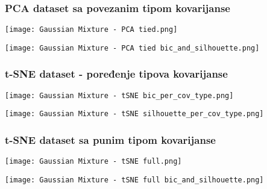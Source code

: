 \documentclass[a4paper]{article}
\begin{document}
        \newpage
        \subsubsection{PCA dataset sa povezanim tipom kovarijanse}
        \begin{center}
            \label{im:Gaussian Mixture - tied}
            \texttt{[image: Gaussian Mixture - PCA tied.png]}
        \end{center}
        \begin{center}
            \label{im:Gaussian Mixture - tied}
            \texttt{[image: Gaussian Mixture - PCA tied bic\_and\_silhouette.png]}
        \end{center}
        
        \newpage
        \subsubsection{t-SNE dataset - poređenje tipova kovarijanse}

        \begin{center}
            \label{im:Gaussian Mixture - tSNE bic_per_cov_type}
            \texttt{[image: Gaussian Mixture - tSNE bic\_per\_cov\_type.png]}
        \end{center}

        \begin{center}
            \label{im:Gaussian Mixture - tSNE silhouette_per_cov_type}
            \texttt{[image: Gaussian Mixture - tSNE silhouette\_per\_cov\_type.png]}
        \end{center}

        \subsubsection{t-SNE dataset sa punim tipom kovarijanse}
        \begin{center}
            \label{im:Gaussian Mixture - full}
            \texttt{[image: Gaussian Mixture - tSNE full.png]}
        \end{center}
        \begin{center}
            \label{im:Gaussian Mixture - full}
            \texttt{[image: Gaussian Mixture - tSNE full bic\_and\_silhouette.png]}
        \end{center}
\end{document}
